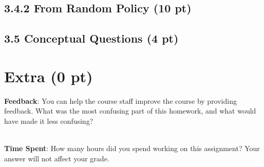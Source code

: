\documentclass[12pt]{article}
\begin{document}
\subsection*{3.4.2 From Random Policy (10 pt)}

\begin{tcolorbox}[fit,height=50em, width=40em, blank, borderline={1pt}{1pt},nobeforeafter]
\begin{center}

\end{center}
\end{tcolorbox}


\subsection*{3.5 Conceptual Questions (4 pt)}

\begin{tcolorbox}[fit,height=22em, width=40em, blank, borderline={1pt}{1pt},nobeforeafter]
\begin{center}

\end{center}
\end{tcolorbox}

\section*{Extra (0 pt)}

\textbf{Feedback}: You can help the course staff improve the course by providing feedback. What was the most confusing part of this homework, and what would have made it less confusing?

\begin{tcolorbox}[fit,height=10em, width=40em, blank, borderline={1pt}{1pt},nobeforeafter]
            \begin{center}
            \end{center}
            \end{tcolorbox}\\

\noindent\textbf{Time Spent}: How many hours did you spend working on this assignment? Your answer will not affect your grade.
\end{document}
